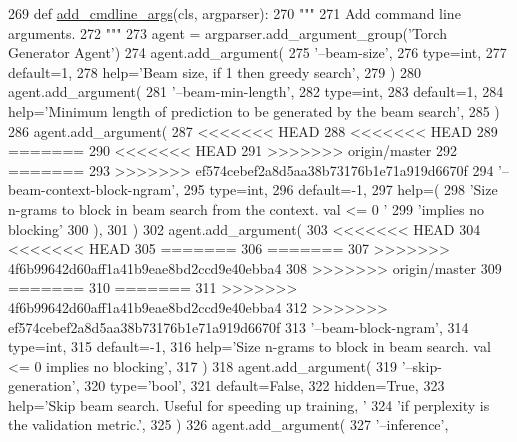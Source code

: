 \begin{DoxyCode}
269     \textcolor{keyword}{def }\hyperlink{namespaceparlai_1_1agents_1_1drqa_1_1config_a62fdd5554f1da6be0cba185271058320}{add\_cmdline\_args}(cls, argparser):
270         \textcolor{stringliteral}{"""}
271 \textcolor{stringliteral}{        Add command line arguments.}
272 \textcolor{stringliteral}{        """}
273         agent = argparser.add\_argument\_group(\textcolor{stringliteral}{'Torch Generator Agent'})
274         agent.add\_argument(
275             \textcolor{stringliteral}{'--beam-size'},
276             type=int,
277             default=1,
278             help=\textcolor{stringliteral}{'Beam size, if 1 then greedy search'},
279         )
280         agent.add\_argument(
281             \textcolor{stringliteral}{'--beam-min-length'},
282             type=int,
283             default=1,
284             help=\textcolor{stringliteral}{'Minimum length of prediction to be generated by the beam search'},
285         )
286         agent.add\_argument(
287 <<<<<<< HEAD
288 <<<<<<< HEAD
289 =======
290 <<<<<<< HEAD
291 >>>>>>> origin/master
292 =======
293 >>>>>>> ef574cebef2a8d5aa38b73176b1e71a919d6670f
294             \textcolor{stringliteral}{'--beam-context-block-ngram'},
295             type=int,
296             default=-1,
297             help=(
298                 \textcolor{stringliteral}{'Size n-grams to block in beam search from the context. val <= 0 '}
299                 \textcolor{stringliteral}{'implies no blocking'}
300             ),
301         )
302         agent.add\_argument(
303 <<<<<<< HEAD
304 <<<<<<< HEAD
305 =======
306 =======
307 >>>>>>> 4f6b99642d60aff1a41b9eae8bd2ccd9e40ebba4
308 >>>>>>> origin/master
309 =======
310 =======
311 >>>>>>> 4f6b99642d60aff1a41b9eae8bd2ccd9e40ebba4
312 >>>>>>> ef574cebef2a8d5aa38b73176b1e71a919d6670f
313             \textcolor{stringliteral}{'--beam-block-ngram'},
314             type=int,
315             default=-1,
316             help=\textcolor{stringliteral}{'Size n-grams to block in beam search. val <= 0 implies no blocking'},
317         )
318         agent.add\_argument(
319             \textcolor{stringliteral}{'--skip-generation'},
320             type=\textcolor{stringliteral}{'bool'},
321             default=\textcolor{keyword}{False},
322             hidden=\textcolor{keyword}{True},
323             help=\textcolor{stringliteral}{'Skip beam search. Useful for speeding up training, '}
324             \textcolor{stringliteral}{'if perplexity is the validation metric.'},
325         )
326         agent.add\_argument(
327             \textcolor{stringliteral}{'--inference'},

\end{DoxyCode}
